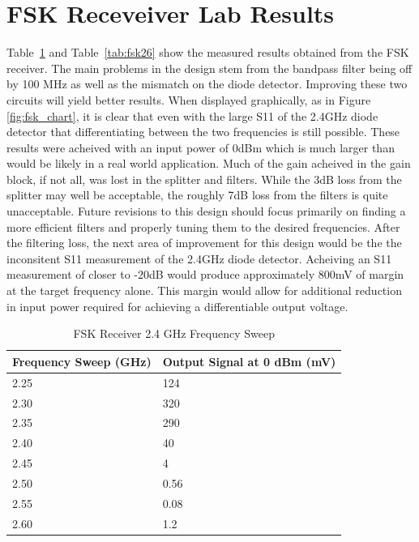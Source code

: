 \documentclass[conference]{IEEEtran}
\begin{document}
\section{FSK Receveiver Lab Results}
Table~\ref{tab:fsk24} and Table~\ref{tab:fsk26} show the measured results obtained from the FSK receiver.  The main problems in the design stem from the bandpass filter being off by 100 MHz as well as the mismatch on the diode detector.  Improving these two circuits will yield better results. When displayed graphically, as in Figure \ref{fig:fsk_chart}, it is clear that even with the large S11 of the 2.4GHz diode detector that differentiating between the two frequencies is still possible. These results were acheived with an input power of 0dBm which is much larger than would be likely in a real world application. Much of the gain acheived in the gain block, if not all, was lost in the splitter and filters. While the 3dB loss from the splitter may well be acceptable, the roughly 7dB loss from the filters is quite unacceptable. Future revisions to this design should focus primarily on finding a more efficient filters and properly tuning them to the desired frequencies. After the filtering loss, the next area of improvement for this design would be the the inconsitent S11 measurement of the 2.4GHz diode detector. Acheiving an S11 measurement of closer to -20dB would produce approximately 800mV of margin at the target frequency alone. This margin would allow for additional reduction in input power required for achieving a differentiable output voltage.

\begin{table}
\caption{FSK Receiver 2.4 GHz Frequency Sweep}
    \begin{tabular}{|l|l|}
    \hline
    Frequency Sweep (GHz) & Output Signal at 0 dBm (mV) \\\hline
    2.25                  & 124                         \\\hline
    2.30                  & 320                         \\\hline
    2.35                  & 290                         \\\hline
    2.40                  & 40                          \\\hline
    2.45                  & 4                           \\\hline
    2.50                  & 0.56                        \\\hline
    2.55                  & 0.08                        \\\hline
    2.60                  & 1.2                         \\\hline
    \end{tabular}
\label{tab:fsk24}
\end{table}
\end{document}
